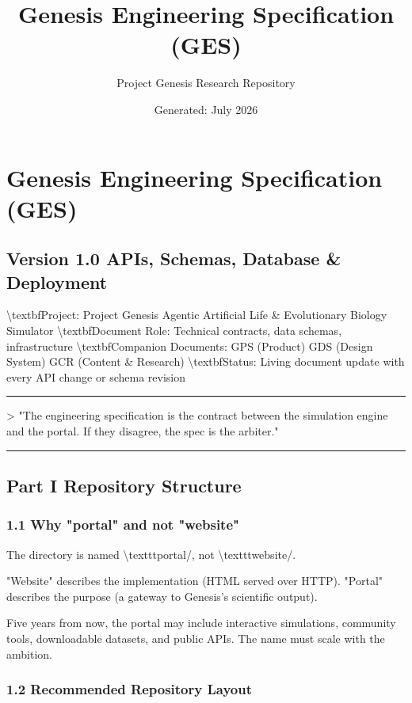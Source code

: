 \documentclass[11pt,a4paper]{article}
\title{\textbf{Genesis Engineering Specification (GES)}}
\author{Project Genesis Research Repository}
\date{\small Generated: July 2026}
\begin{document}
\maketitle
\thispagestyle{empty}

\newpage
\section*{Genesis Engineering Specification (GES)}
\subsection*{Version 1.0  APIs, Schemas, Database \& Deployment}

\textbackslash{}textbf{Project:} Project Genesis  Agentic Artificial Life \& Evolutionary Biology Simulator
\textbackslash{}textbf{Document Role:} Technical contracts, data schemas, infrastructure
\textbackslash{}textbf{Companion Documents:} GPS (Product)  GDS (Design System)  GCR (Content \& Research)
\textbackslash{}textbf{Status:} Living document  update with every API change or schema revision

\noindent\rule{\textwidth}{0.4pt}

\textgreater{} "The engineering specification is the contract between the simulation engine and the portal. If they disagree, the spec is the arbiter."

\noindent\rule{\textwidth}{0.4pt}

\subsection*{Part I  Repository Structure}

\subsubsection*{1.1 Why "portal" and not "website"}

The directory is named \textbackslash{}texttt{portal/}, not \textbackslash{}texttt{website/}.

"Website" describes the implementation (HTML served over HTTP).
"Portal" describes the purpose (a gateway to Genesis's scientific output).

Five years from now, the portal may include interactive simulations, community tools, downloadable datasets, and public APIs. The name must scale with the ambition.

\subsubsection*{1.2 Recommended Repository Layout}
\end{document}

